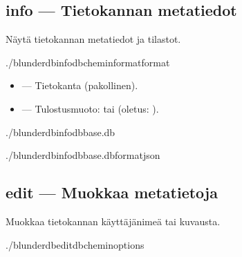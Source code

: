 \documentclass[letterpaper,10pt,finnish]{sphinxmanual}
\begin{document}
\subsection{info — Tietokannan metatiedot}
\label{\detokenize{cli:info-metadonnees-de-la-base}}
\sphinxAtStartPar
Näytä tietokannan metatiedot ja tilastot.

\begin{sphinxVerbatim}[commandchars=\\\{\}]
./blunderdbinfo\PYGZhy{}\PYGZhy{}db\PYGZlt{}chemin\PYGZgt{}\PYG{o}{[}\PYGZhy{}\PYGZhy{}format\PYGZlt{}format\PYGZgt{}\PYG{o}{]}
\end{sphinxVerbatim}

\sphinxAtStartPar
{}
\begin{itemize}
\item {} 
\sphinxAtStartPar
{} — Tietokanta (pakollinen).

\item {} 
\sphinxAtStartPar
{} — Tulostusmuoto:  tai  (oletus: ).

\end{itemize}

\sphinxAtStartPar
{}

\begin{sphinxVerbatim}[commandchars=\\\{\}]
./blunderdbinfo\PYGZhy{}\PYGZhy{}dbbase.db

./blunderdbinfo\PYGZhy{}\PYGZhy{}dbbase.db\PYGZhy{}\PYGZhy{}formatjson
\end{sphinxVerbatim}


\subsection{edit — Muokkaa metatietoja}
\label{\detokenize{cli:edit-modifier-les-metadonnees}}
\sphinxAtStartPar
Muokkaa tietokannan käyttäjänimeä tai kuvausta.

\begin{sphinxVerbatim}[commandchars=\\\{\}]
./blunderdbedit\PYGZhy{}\PYGZhy{}db\PYGZlt{}chemin\PYGZgt{}\PYG{o}{[}options\PYG{o}{]}
\end{sphinxVerbatim}
\end{document}
